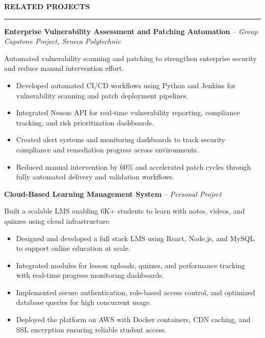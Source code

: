\documentclass[10pt,letterpaper]{article}
\begin{document}
\vspace{6pt}

\textbf{RELATED PROJECTS}\\[-8pt]
\noindent\rule{\textwidth}{1pt}

\vspace{-2pt}

\textbf{Enterprise Vulnerability Assessment and Patching Automation} -- \emph{Group Capstone Project, Seneca Polytechnic}

\vspace{-1pt}

Automated vulnerability scanning and patching to strengthen enterprise security and reduce manual intervention effort.
\vspace{-1pt}
\begin{itemize}
\item Developed automated CI/CD workflows using Python and Jenkins for vulnerability scanning and patch deployment pipelines.
\item Integrated Nessus API for real-time vulnerability reporting, compliance tracking, and risk prioritization dashboards.
\item Created alert systems and monitoring dashboards to track security compliance and remediation progress across environments.
\item Reduced manual intervention by 60\% and accelerated patch cycles through fully automated delivery and validation workflows.
\end{itemize}

\textbf{Cloud-Based Learning Management System} -- \emph{Personal Project}

\vspace{-1pt}

Built a scalable LMS enabling 6K+ students to learn with notes, videos, and quizzes using cloud infrastructure.
\vspace{-1pt}
\begin{itemize}
\item Designed and developed a full stack LMS using React, Node.js, and MySQL to support online education at scale.
\item Integrated modules for lesson uploads, quizzes, and performance tracking with real-time progress monitoring dashboards.
\item Implemented secure authentication, role-based access control, and optimized database queries for high concurrent usage.
\item Deployed the platform on AWS with Docker containers, CDN caching, and SSL encryption ensuring reliable student access.
\end{itemize}
\end{document}

